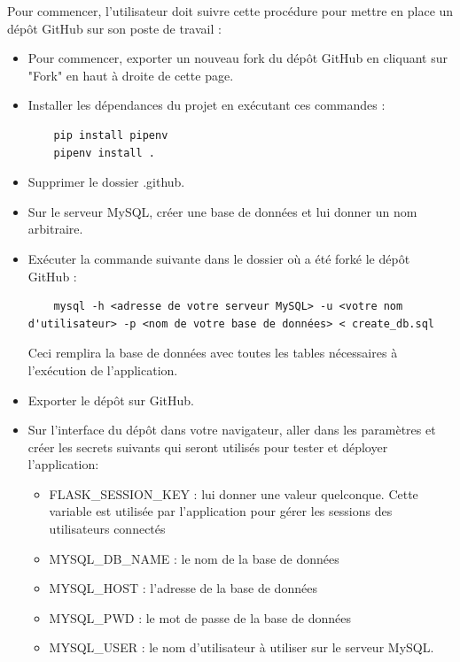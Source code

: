 \documentclass[french]{article}
\begin{document}
    Pour commencer, l'utilisateur doit suivre cette procédure pour mettre en place un dépôt GitHub sur son poste de travail :
    \begin{itemize}
    \item Pour commencer, exporter un nouveau fork du dépôt GitHub en cliquant sur "Fork" en haut à droite de cette page.
    \item Installer les dépendances du projet en exécutant ces commandes :
    \begin{verbatim}
    pip install pipenv
    pipenv install .
    \end{verbatim}
    \item Supprimer le dossier .github.
    \item Sur le serveur MySQL, créer une base de données et lui donner un nom arbitraire.
    \item Exécuter la commande suivante dans le dossier où a été forké le dépôt GitHub :
    \begin{verbatim}
    mysql -h <adresse de votre serveur MySQL> -u <votre nom d'utilisateur> -p <nom de votre base de données> < create_db.sql
    \end{verbatim}
    Ceci remplira la base de données avec toutes les tables nécessaires à l'exécution de l'application.
    \item Exporter le dépôt sur GitHub. 
    \item Sur l'interface du dépôt dans votre navigateur, aller dans les paramètres et créer les secrets suivants qui seront utilisés pour tester et déployer l'application:
    \begin{itemize}
        \item FLASK\_SESSION\_KEY : lui donner une valeur quelconque. Cette variable est utilisée par l'application pour gérer les sessions des utilisateurs connectés
        \item MYSQL\_DB\_NAME : le nom de la base de données
        \item MYSQL\_HOST : l'adresse de la base de données
        \item MYSQL\_PWD : le mot de passe de la base de données
        \item MYSQL\_USER : le nom d'utilisateur à utiliser sur le serveur MySQL.
    \end{itemize}
    \end{itemize}
\end{document}
